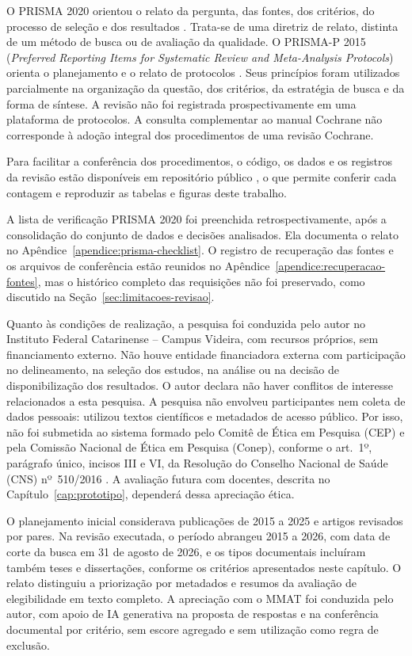 O PRISMA 2020 orientou o relato da pergunta, das fontes, dos critérios, do processo de seleção e dos resultados \cite{PRISMA2020}. Trata-se de uma diretriz de relato, distinta de um método de busca ou de avaliação da qualidade. O PRISMA-P 2015 (\textit{Preferred Reporting Items for Systematic Review and Meta-Analysis Protocols}) orienta o planejamento e o relato de protocolos \cite{PRISMAP2015}. Seus princípios foram utilizados parcialmente na organização da questão, dos critérios, da estratégia de busca e da forma de síntese. A revisão não foi registrada prospectivamente em uma plataforma de protocolos. A consulta complementar ao manual Cochrane não corresponde à adoção integral dos procedimentos de uma revisão Cochrane.

Para facilitar a conferência dos procedimentos, o código, os dados e os registros da revisão estão disponíveis em repositório público \cite{BatistaCCWCode2026}, o que permite conferir cada contagem e reproduzir as tabelas e figuras deste trabalho.

A lista de verificação PRISMA 2020 foi preenchida retrospectivamente, após a consolidação do conjunto de dados e decisões analisados. Ela documenta o relato no Apêndice~\ref{apendice:prisma-checklist}. O registro de recuperação das fontes e os arquivos de conferência estão reunidos no Apêndice~\ref{apendice:recuperacao-fontes}, mas o histórico completo das requisições não foi preservado, como discutido na Seção~\ref{sec:limitacoes-revisao}.

\label{sec:apoio-pesquisa}
Quanto às condições de realização, a pesquisa foi conduzida pelo autor no Instituto Federal Catarinense – Campus Videira, com recursos próprios, sem financiamento externo. Não houve entidade financiadora externa com participação no delineamento, na seleção dos estudos, na análise ou na decisão de disponibilização dos resultados. O autor declara não haver conflitos de interesse relacionados a esta pesquisa. A pesquisa não envolveu participantes nem coleta de dados pessoais: utilizou textos científicos e metadados de acesso público. Por isso, não foi submetida ao sistema formado pelo Comitê de Ética em Pesquisa (CEP) e pela Comissão Nacional de Ética em Pesquisa (Conep), conforme o art.~1º, parágrafo único, incisos III e VI, da Resolução do Conselho Nacional de Saúde (CNS) nº~510/2016 \cite{CNS5102016}. A avaliação futura com docentes, descrita no Capítulo~\ref{cap:prototipo}, dependerá dessa apreciação ética.

O planejamento inicial considerava publicações de 2015 a 2025 e artigos revisados por pares. Na revisão executada, o período abrangeu 2015 a 2026, com data de corte da busca em 31 de agosto de 2026, e os tipos documentais incluíram também teses e dissertações, conforme os critérios apresentados neste capítulo. O relato distinguiu a priorização por metadados e resumos da avaliação de elegibilidade em texto completo. A apreciação com o MMAT foi conduzida pelo autor, com apoio de IA generativa na proposta de respostas e na conferência documental por critério, sem escore agregado e sem utilização como regra de exclusão.


